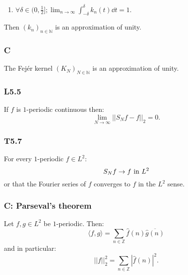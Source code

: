 \documentclass{article}
\begin{document}
\begin{multicols*}{3}
\begin{enumerate}
    \item $\forall\delta\in(0,\frac{1}{2}];
    \displaystyle\lim_{n\rightarrow\infty}
    \int_{-\delta}^{\delta}k_n(t)\dd t=1$.
\end{enumerate}
Then $(k_n)_{n\in\mathbb{N}}$
is an approximation of unity.

\subsubsection*{C}
The Fej\'er kernel $(K_N)_{N\in\mathbb{N}}$
is an approximation of unity.

\subsubsection*{L5.5}
If $f$ is $1$-periodic continuous
then:
$$\lim_{N\rightarrow\infty}||S_N f-f||_2=0.$$

\subsubsection*{T5.7}
For every $1$-periodic $f\in L^2$:
$$S_N f\rightarrow f
\hspace{0.05in}\text{in $L^2$}$$
or that the Fourier series of $f$
converges to $f$ 
in the $L^2$ sense.

\subsubsection*{C: Parseval's theorem}
Let $f,g\in L^2$ be $1$-periodic. Then:
$$\langle f,g\rangle=
\sum_{n\in\mathbb{Z}}\widehat{f}(n)
\overline{\widehat{g}(n)}$$
and in particular:
$$||f||_2^2=\sum_{n\in\mathbb{Z}}
|\widehat{f}(n)|^2.$$

\end{multicols*}
\end{document}
